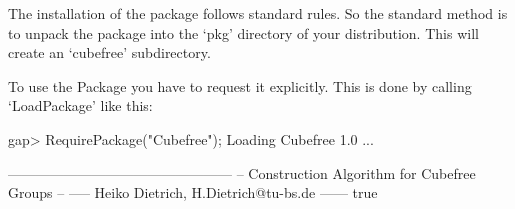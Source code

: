 

\null

The installation of the {\Cubefree} package follows standard {\GAP} rules.
So the standard method is to unpack the package into the `pkg'
directory  of your {\GAP} distribution.  This will create an `cubefree'
subdirectory.



\null

To use the {\Cubefree} Package you have to request it explicitly. This  is
done by calling `LoadPackage' like this:

\beginexample
gap> RequirePackage("Cubefree");
Loading Cubefree 1.0 ...

   ------------------------------------------------
   -- Construction Algorithm for Cubefree Groups --
   ----- Heiko Dietrich, H.Dietrich@tu-bs.de ------
true
\endexample



